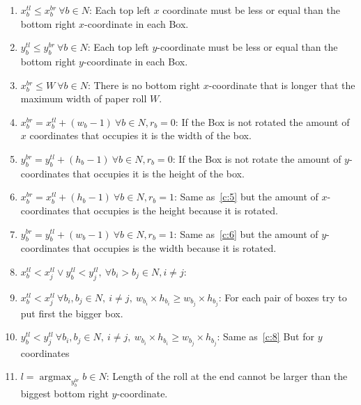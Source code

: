 \documentclass[12pt, a4paper]{article}
\DeclareMathOperator*{\argmax}{argmax} %
\begin{document}
\begin{enumerate}
  \item $x_b^{tl} \leq x_b^{br}\ \forall b \in N$: Each top left $x$ coordinate must be less or equal than the bottom right $x$-coordinate in each Box.
  \item $y_b^{tl} \leq y_b^{br}\ \forall b \in N$: Each top left $y$-coordinate must be less or equal than the bottom right $y$-coordinate in each Box.
  \item\label{c:4} $x_b^{br} \leq W\ \forall b \in N$: There is no bottom right $x$-coordinate that is longer that the maximum width of paper roll $W$.
\item\label{c:5} $x_b^{br} = x_b^{tl} + (w_b - 1)\ \forall b \in N, r_b = 0$: If the Box is not rotated the amount of $x$ coordinates that occupies it is the width of the box.
\item\label{c:6} $y_b^{br} = y_b^{tl} + (h_b - 1)\ \forall b \in N, r_b = 0$: If the Box is not rotate the amount of $y$-coordinates that occupies it is the height of the box.
\item $x_b^{br} = x_b^{tl} + (h_b - 1)\ \forall b \in N, r_b = 1$: Same as~\ref{c:5} but the amount of $x$-coordinates that occupies is the height because it is rotated.
  \item $y_b^{br} = y_b^{tl} + (w_b - 1)\ \forall b \in N, r_b = 1$: Same as~\ref{c:6} but the amount of $y$-coordinates that occupies is the width because it is rotated.
  \item $x_b^{tl} < x_j^{tl} \lor y_b^{tl} < y_j^{tl}, \ \forall b_i > b_j \in N, i \neq j$:
  \item\label{c:8} $x_b^{tl} < x_j^{tl}\ \forall b_i, b_j \in N,\ i \neq j,\ w_{b_i} \times h_{b_i} \geq w_{b_j} \times h_{b_j}$: For each pair of boxes try to put first the bigger box.
  \item $y_b^{tl} < y_j^{tl}\ \forall b_i, b_j \in N,\ i \neq j,\ w_{b_i} \times h_{b_i} \geq w_{b_j} \times h_{b_j}$: Same as~\ref{c:8} But for $y$ coordinates
  \item $l = \argmax_{y_b^{br}} {b \in N}$: Length of the roll at the end cannot be larger than the biggest bottom right $y$-coordinate.
\end{enumerate}
\end{document}
